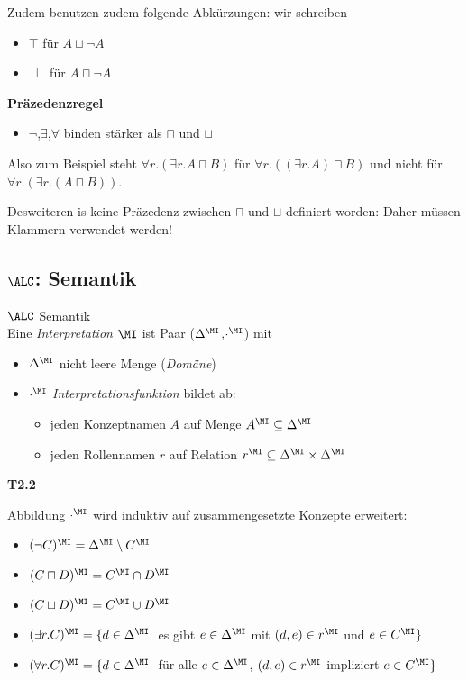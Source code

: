 Zudem benutzen zudem folgende Abkürzungen: wir schreiben

\begin{itemize}
	\item{$\top$ für $A \sqcup \neg A$}
	\item{$\perp$ für $A \sqcap \neg A$}
\end{itemize}

\textbf{Präzedenzregel}

\begin{itemize}
	\item{$\neg$,$\exists$,$\forall$ binden stärker als $\sqcap$ und $\sqcup$}
\end{itemize}

Also zum Beispiel steht $\forall r.(\exists r.A \sqcap B)$ für $\forall r.((\exists r.A) \sqcap B)$ und nicht für $\forall r.(\exists r.(A \sqcap B))$.

Desweiteren is keine Präzedenz zwischen $\sqcap$ und $\sqcup$ definiert worden: Daher müssen Klammern verwendet werden!

\subsection{$\ALC$: Semantik}

\begin{definition}{$\ALC$ Semantik} \\
Eine \emph{Interpretation} $\MI$ ist Paar ($\Delta^{\MI}$,$\cdot^{\MI}$) mit
	\begin{itemize}
		\item{$\Delta^{\MI}$ nicht leere Menge (\emph{Domäne})}
		\item{$\cdot^{\MI}$ \emph{Interpretationsfunktion} bildet ab:
		 \begin{itemize}
			 \item{jeden Konzeptnamen $A$ auf Menge $A^{\MI} \subseteq \Delta^{\MI}$}
			 \item{jeden Rollennamen $r$ auf Relation $r^{\MI} \subseteq \Delta^{\MI} \times \Delta^{\MI}$}
		 \end{itemize}}
	\end{itemize}
\end{definition}

\textbf{T2.2}


Abbildung $\cdot^{\MI}$ wird induktiv auf zusammengesetzte Konzepte erweitert:

\begin{itemize}
	\item $(\neg C)^{\MI} = \Delta^{\MI} \setminus C^{\MI}$
	\item $(C \sqcap D)^{\MI} = C^{\MI} \cap D^{\MI}$
	\item $(C \sqcup D)^{\MI} = C^{\MI} \cup D^{\MI}$
	\item $(\exists r.C)^{\MI} = \{d \in \Delta^{\MI} |$ es gibt $ e \in \Delta^{\MI}$ mit $(d,e) \in r^{\MI}$ und $e \in C^{\MI}\}$
	\item $(\forall r.C)^{\MI} = \{d \in \Delta^{\MI} |$ für alle $ e \in \Delta^{\MI}$, $(d,e) \in r^{\MI}$ impliziert $e \in C^{\MI}\}$
\end{itemize}

